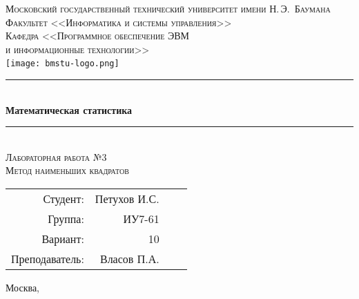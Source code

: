 \newcommand{\HRule}{\rule{\linewidth}{0.5mm}}

\begin{center}

\textsc{\large Московский государственный технический университет имени Н.\,Э.~Баумана}\\[0.5cm]
\textsc{Факультет <<Информатика и системы управления>>}\\
\textsc{Кафедра <<Программное обеспечение ЭВМ\\и информационные технологии>>}\\[0.25cm]

\texttt{[image: bmstu-logo.png]}~\\[2.25cm]



\HRule \\[0.5cm]
{\huge \bfseries Математическая статистика}
\HRule \\[0.5cm]

\textsc{\large Лабораторная работа №3}\\
\textsc{Метод наименьших квадратов}

\vfill

\begin{flushright}
  \begin{tabular}{rrlc}
    Студент: & Петухов И.С.\\
    Группа: & ИУ7-61\\
    Вариант: & 10\\
    Преподаватель: & Власов П.А.\\
  \end{tabular}
\end{flushright}

{\large Москва, \the\year}

\end{center}

\newpage
{}